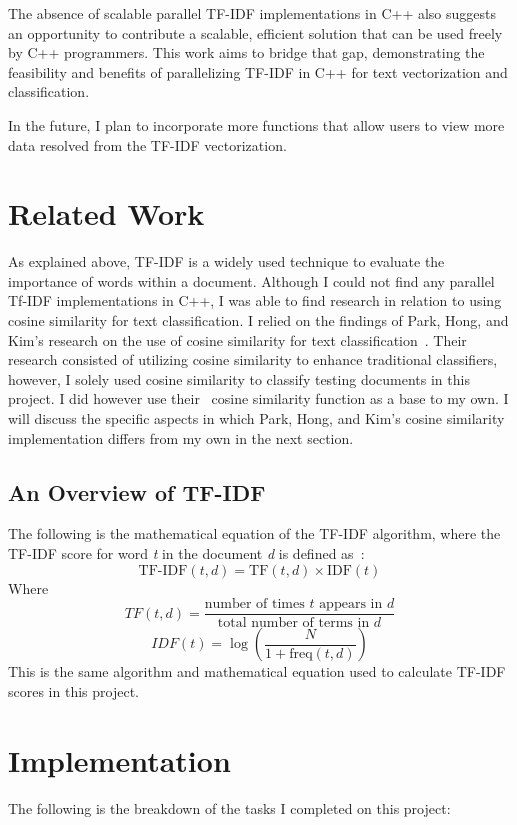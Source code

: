 \documentclass[conference]{IEEEtran}
\begin{document}
The absence of scalable parallel  TF-IDF implementations in C++ also suggests an opportunity to contribute a scalable, efficient solution that can be used freely by C++ programmers. This work aims to bridge that gap, demonstrating the feasibility and benefits of parallelizing TF-IDF in C++ for text vectorization and classification.

In the future, I plan to incorporate more functions that allow users to view more data resolved from the TF-IDF vectorization.

\section{Related Work}
As explained above, TF-IDF is a widely used technique to evaluate the importance of words within a document. Although I could not find any parallel Tf-IDF implementations in C++, I was able to find research in relation to using cosine similarity for text classification. I relied on the findings of Park, Hong, and Kim's research on the use of cosine similarity for text classification~\cite{b2}. Their research consisted of utilizing cosine similarity to enhance traditional classifiers, however, I solely used cosine similarity to classify testing documents in this project. I did however use their~\cite{b2} cosine similarity function as a base to my own. I will discuss the specific aspects in which Park, Hong, and Kim's cosine similarity implementation differs from my own in the next section. 

\subsection{An Overview of TF-IDF}
The following is the mathematical equation of the TF-IDF algorithm, where the TF-IDF score for word \textit{t} in the document \textit{d} is defined as~\cite{b7}:
\[
\text{TF-IDF}(t, d) = \text{TF}(t, d) \times \text{IDF}(t)
\]
Where
\[
TF(t,d) = \frac{\text{number of times } t \text{ appears in } d}{\text{total number of terms in } d}
\]
\[
IDF(t) = \log \left( \frac{N}{1 + \text{freq}(t,d)} \right)
\]
This is the same algorithm and mathematical equation used to calculate TF-IDF scores in this project.

\section{Implementation} \label{sec:implementation}
The following is the breakdown of the tasks I completed on this project:
\end{document}
